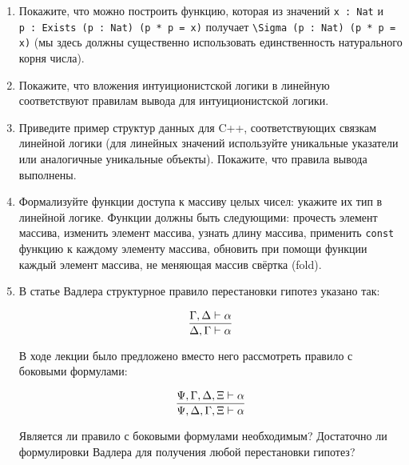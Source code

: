 \documentclass[10pt,a4paper,oneside]{article}
\begin{document}
\begin{enumerate}
\begin{enumerate}
\item Замените \verb!{?}! в тексте выше на корректное доказательство.
\item Определите функцию, которая бы по $x$ и значению $\exists p q.3 \cdot p + q = x \with 0 \le q < 3$ возвращала бы \verb!Div3 x!
(понятно, можно разделить $x$ на 3, но нам уже результат деления дали вторым аргументом --- задача в том, чтобы им воспользоваться).
\item Постройте аналогичный тип \verb!Prime x! для простых чисел --- с тремя вариантами \verb!less-than-two!, \verb!is-prime!, 
\verb!is-composite! --- и определите функцию, строящую по числу данный тип.
\item Покажите, что в типе \verb!Prime (x*x + 2*x + 1)! всегда (кроме граничных случаев) обитает вариант \verb!is-composite!.
\item Покажите, что в типе 
\begin{verbatim}
\data SuperDec (P : \Prop)
| sure P
| nope (P -> Empty)
| neither ((P || (P -> Empty)) -> Empty)
\where \use \level superDecProp {P : \Prop} (a b : SuperDec P): a = b => {?}
\end{verbatim}
вариант \verb!neither! невозможен (также, заполните пропущенное доказательство \verb!superDecProp!).
\end{enumerate}

\item Покажите, что можно построить функцию, которая из значений \verb!x : Nat! и\\\verb!p : Exists (p : Nat) (p * p = x)! получает
\verb!\Sigma (p : Nat) (p * p = x)! (мы здесь должны существенно использовать единственность натурального корня числа).
\item Покажите, что вложения интуиционистской логики в линейную соответствуют правилам вывода для интуиционистской логики.
\item Приведите пример структур данных для C++, соответствующих связкам линейной логики (для линейных значений используйте 
уникальные указатели или аналогичные уникальные объекты). Покажите, что правила вывода выполнены.
\item Формализуйте функции доступа к массиву целых чисел: укажите их тип в линейной логике. Функции должны быть следующими:
прочесть элемент массива, изменить элемент массива, узнать длину массива, применить \verb!const! функцию к каждому элементу
массива, обновить при помощи функции каждый элемент массива, не меняющая массив свёртка (fold).
\item В статье Вадлера структурное правило перестановки гипотез указано так:

$$\infer{\Delta,\Gamma\vdash\alpha}{\Gamma,\Delta\vdash\alpha}$$

В ходе лекции было предложено вместо него рассмотреть правило с боковыми формулами:

$$\infer{\Psi,\Delta,\Gamma,\Xi\vdash\alpha}{\Psi,\Gamma,\Delta,\Xi\vdash\alpha}$$

Является ли правило с боковыми формулами необходимым? Достаточно ли формулировки Вадлера для получения любой перестановки 
гипотез?

\end{enumerate}
\end{document}
